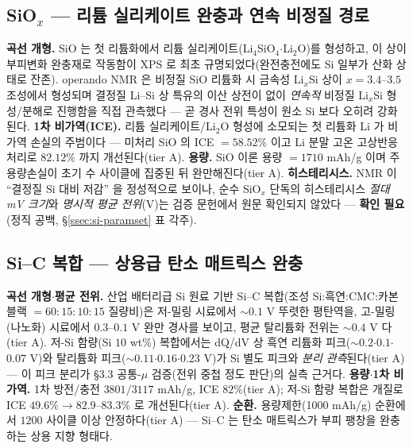 \subsection{SiO$_x$ --- 리튬 실리케이트 완충과 연속 비정질 경로}\label{ssec:si-siox}
\textbf{곡선 개형.} SiO 는 첫 리튬화에서 리튬 실리케이트(Li$_4$SiO$_4$$\cdot$Li$_2$O)를 형성하고, 이 상이
부피변화 완충재로 작동함이 XPS 로 최초 규명되었다(완전충전에도 Si 일부가 산화 상태로
잔존)\cite{miyachi_sio2005}. operando NMR 은 비정질 SiO 리튬화 시 금속성 Li$_x$Si 상이 $x{=}3.4$--$3.5$
조성에서 형성되며 결정질 Li--Si 상 특유의 이산 상전이 없이 \emph{연속적} 비정질 Li$_x$Si 형성/분해로
진행함을 직접 관측했다\cite{kitada_sio2019} --- 곧 경사 전위 특성이 원소 Si 보다 오히려 강화된다.
\textbf{1차 비가역(ICE).} 리튬 실리케이트/Li$_2$O 형성에 소모되는 첫 리튬화 Li 가 비가역 손실의 주범이다
--- 미처리 SiO 의 ICE $=58.52\%$ 이고 Li 분말 고온 고상반응 처리로 $82.12\%$ 까지 개선된다(tier
A\cite{yom_sio2016}). \textbf{용량.} SiO 이론 용량 $=1710$ mAh/g 이며 주 용량손실이 초기 수 사이클에
집중된 뒤 완만해진다(tier A\cite{zhang_sio2018}). \textbf{히스테리시스.} NMR 이 ``결정질 Si 대비 저감''
을 정성적으로 보이나\cite{kitada_sio2019}, 순수 SiO$_x$ 단독의 히스테리시스 \emph{절대 mV 크기}와
\emph{명시적 평균 전위}(V)는 검증 문헌에서 원문 확인되지 않았다 --- \textbf{확인 필요}(정직 공백,
\S\ref{ssec:si-paramset} 표 각주).

\subsection{Si--C 복합 --- 상용급 탄소 매트릭스 완충}\label{ssec:si-sic}
\textbf{곡선 개형$\cdot$평균 전위.} 산업 배터리급 Si 원료 기반 Si--C 복합(조성 Si:흑연:CMC:카본블랙
$=60{:}15{:}10{:}15$ 질량비)은 저-밀링 시료에서 $\sim0.1$ V 뚜렷한 평탄역을, 고-밀링(나노화) 시료에서
$0.3$--$0.1$ V 완만 경사를 보이고, 평균 탈리튬화 전위는 $\sim0.4$ V 다(tier A\cite{andersen_sic2019}).
저-Si 함량(Si $10$ wt\%) 복합에서는 dQ/dV 상 흑연 리튬화 피크($\sim0.2$$\cdot$$0.1$$\cdot$$0.07$ V)와
탈리튬화 피크($\sim0.11$$\cdot$$0.16$$\cdot$$0.23$ V)가 Si 별도 피크와 \emph{분리 관측}된다(tier
A\cite{naboka_sic2021}) --- 이 피크 분리가 §3.3 공통-$\mu$ 검증(전위 중첩 정도 판단)의 실측 근거다.
\textbf{용량$\cdot$1차 비가역.} 1차 방전/충전 $3801/3117$ mAh/g, ICE $82\%$(tier
A\cite{andersen_sic2019}); 저-Si 함량 복합은 개질로 ICE $49.6\%\to82.9$--$83.3\%$ 로 개선된다(tier
A\cite{naboka_sic2021}). \textbf{순환.} 용량제한(1000 mAh/g) 순환에서 $1200$ 사이클 이상 안정하다(tier
A\cite{andersen_sic2019}) --- Si--C 는 탄소 매트릭스가 부피 팽창을 완충하는 상용 지향 형태다.

